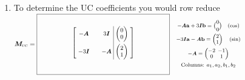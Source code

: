 \documentclass[12pt,letterpaper]{article}
\newcommand{\vect}[1]{\mathbf{#1}}
\newcommand{\mat}[1]{\bm{#1}}
\newcommand{\KeyBox}[3]{%
  \vcenter{\hbox{$\boxed{%
    \rule{0pt}{#2}\makebox[#1][c]{%
      \smash{\raisebox{\dimexpr#2/2\relax}{%
        \small\setlength{\arraycolsep}{3pt}\renewcommand{\arraystretch}{0.95}%
        $\vcenter{\hbox{$\displaystyle #3$}}$}}}}$}}}
\newcommand{\KeySide}[2]{\quad\vcenter{\hbox{\parbox{#1}{\footnotesize\setlength{\arraycolsep}{2pt}\ensuremath{\begin{gathered}#2\end{gathered}}}}}}
\begin{document}
\begin{enumerate}
\begin{enumerate}
\item To determine the UC coefficients you would row reduce
\newline
$\mat{M}_{\text{\textsc{uc}}}=\KeyBox{2.7in}{1.20in}{\left[\begin{array}{c@{\qquad}c|c}-\mat{A}&3\mat{I}&\begin{pmatrix}0\\0\end{pmatrix}\\[10pt]-3\mat{I}&-\mat{A}&\begin{pmatrix}2\\1\end{pmatrix}\end{array}\right]}\KeySide{3in}{-\mat{A}\vect{a}+3\mat{I}\vect{b}=\binom{0}{0}\quad(\cos)\\-3\mat{I}\vect{a}-\mat{A}\vect{b}=\begin{pmatrix}2\\1\end{pmatrix}\quad(\sin)\\-\mat{A}=\begin{pmatrix}-2&-1\\0&1\end{pmatrix}\\\text{Columns: }a_1,a_2,b_1,b_2}$
\end{enumerate}
\end{enumerate}
\end{document}
